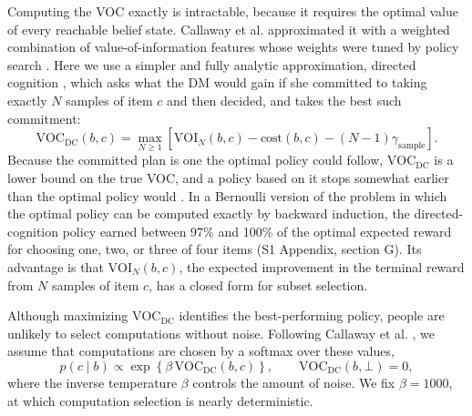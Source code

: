 \documentclass[10pt,letterpaper]{article}
\begin{document}
Computing the VOC exactly is intractable, because it requires the
optimal value of every reachable belief state. Callaway et al.
\cite{callaway2021} approximated it with a weighted combination of
value-of-information features whose weights were tuned by policy search
\cite{callaway2018}. Here we use a simpler and fully analytic
approximation, directed cognition \cite{gabaix2005,gabaix2006}, which
asks what the DM would gain if she committed to taking exactly \(N\)
samples of item \(c\) and then decided, and takes the best such
commitment: \begin{equation}
\text{VOC}_{\text{DC}}(b, c) = \max_{N \ge 1}\left[\text{VOI}_N(b, c) - \text{cost}(b, c) - (N - 1)\gamma_{\text{sample}}\right]. 
\end{equation} Because the committed plan is one the optimal policy
could follow, \(\text{VOC}_{\text{DC}}\) is a lower bound on the true
VOC, and a policy based on it stops somewhat earlier than the optimal
policy would \cite{lieder2026}. In a Bernoulli version of the problem in
which the optimal policy can be computed exactly by backward induction,
the directed-cognition policy earned between 97\% and 100\% of the
optimal expected reward for choosing one, two, or three of four items
(S1 Appendix, section G). Its advantage is that \(\text{VOI}_N(b, c)\),
the expected improvement in the terminal reward from \(N\) samples of
item \(c\), has a closed form for subset selection.

Although maximizing \(\text{VOC}_{\text{DC}}\) identifies the
best-performing policy, people are unlikely to select computations
without noise. Following Callaway et al. \cite{callaway2021}, we assume
that computations are chosen by a softmax over these values,
\begin{equation*}
p(c \mid b) \propto \exp\!\left\{\beta\, \text{VOC}_{\text{DC}}(b, c)\right\}, \qquad \text{VOC}_{\text{DC}}(b, \bot) = 0,
\end{equation*} where the inverse temperature \(\beta\) controls the
amount of noise. We fix \(\beta = 1000\), at which computation selection
is nearly deterministic.
\end{document}
